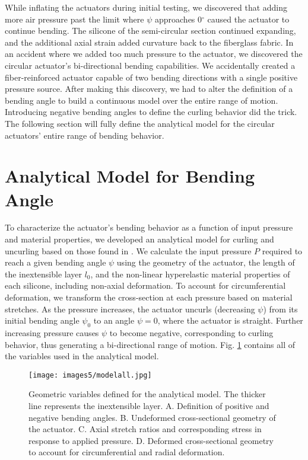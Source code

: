 While inflating the actuators during initial testing, we discovered that adding more air pressure past the limit where $\psi$ approaches 0$^\circ$ caused the actuator to continue bending. The silicone of the semi-circular section continued expanding, and the additional axial strain added curvature back to the fiberglass fabric. In an accident where we added too much pressure to the actuator, we discovered the circular actuator's bi-directional bending capabilities. We accidentally created a fiber-reinforced actuator capable of two bending directions with a single positive pressure source. After making this discovery, we had to alter the definition of a bending angle to build a continuous model over the entire range of motion. Introducing negative bending angles to define the curling behavior did the trick. The following section will fully define the analytical model for the circular actuators' entire range of bending behavior. 

\section{Analytical Model for Bending Angle}

To characterize the actuator's bending behavior as a function of input pressure and material properties, we developed an analytical model for curling and uncurling based on those found in \cite{polygerinos_modeling_2015, connolly_automatic_2017, hu_precurved_2022}. We calculate the input pressure $P$ required to reach a given bending angle $\psi$ using the geometry of the actuator, the length of the inextensible layer $l_0$, and the non-linear hyperelastic material properties of each silicone, including non-axial deformation. To account for circumferential deformation, we transform the cross-section at each pressure based on material stretches. As the pressure increases, the actuator uncurls (decreasing $\psi$) from its initial bending angle $\psi_0$ to an angle $\psi=0$, where the actuator is straight. Further increasing pressure causes $\psi$ to become negative, corresponding to curling behavior, thus generating a bi-directional range of motion. Fig. \ref{fig:modelall} contains all of the variables used in the analytical model. 

\begin{figure}[h]
    \centering
     \texttt{[image: images5/modelall.jpg]}
    \caption{Geometric variables defined for the analytical model. The thicker line represents the inextensible layer. A. Definition of positive and negative bending angles. B. Undeformed cross-sectional geometry of the actuator. C. Axial stretch ratios and corresponding stress in response to applied pressure. D. Deformed cross-sectional geometry to account for circumferential and radial deformation.}
    \label{fig:modelall}
\end{figure}

